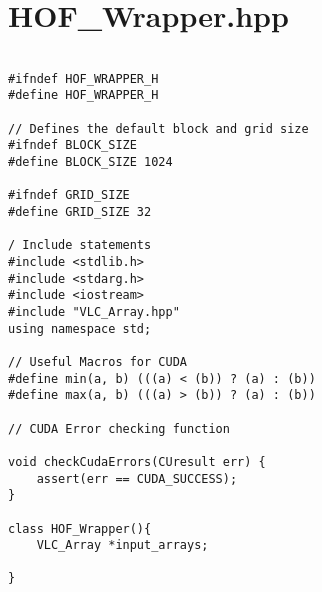 \section{HOF_Wrapper.hpp}
\begin{verbatim}

#ifndef HOF_WRAPPER_H
#define HOF_WRAPPER_H

// Defines the default block and grid size
#ifndef BLOCK_SIZE
#define BLOCK_SIZE 1024

#ifndef GRID_SIZE
#define GRID_SIZE 32

/ Include statements
#include <stdlib.h>
#include <stdarg.h>
#include <iostream>
#include "VLC_Array.hpp"
using namespace std;

// Useful Macros for CUDA
#define min(a, b) (((a) < (b)) ? (a) : (b))
#define max(a, b) (((a) > (b)) ? (a) : (b))

// CUDA Error checking function

void checkCudaErrors(CUresult err) {
	assert(err == CUDA_SUCCESS);
}

class HOF_Wrapper(){
	VLC_Array *input_arrays;
	
}
\end{verbatim}	